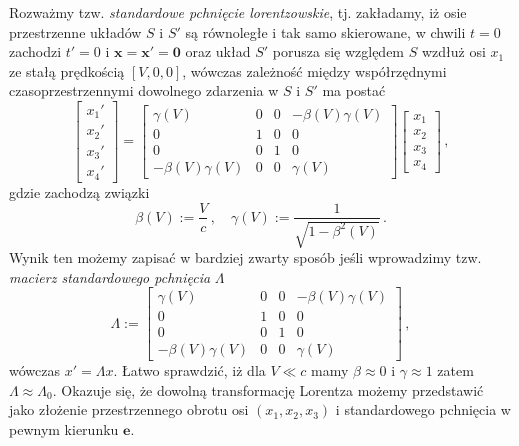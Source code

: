 \documentclass[../main.tex]{subfiles}
\begin{document}
Rozważmy tzw. \textit{standardowe pchnięcie lorentzowskie}, tj. zakładamy, iż osie przestrzenne układów \(S\) i \(S'\) są równoległe i tak samo skierowane, w chwili \(t=0\) zachodzi \(t'=0\) i \(\mathbf{x}=\mathbf{x}'=\mathbf{0}\) oraz układ \(S'\) porusza się względem \(S\) wzdłuż osi \(x_1\) ze stałą prędkością \([V,0,0]\), wówczas zależność między współrzędnymi czasoprzestrzennymi dowolnego zdarzenia w \(S\) i \(S'\) ma postać
\begin{equation*}
    \left[\begin{array}{c}
         x_1'  \\
         x_2'\\
         x_3'\\
         x_4'
    \end{array}\right]=
    \left[\begin{array}{cccc}
         \gamma(V)&0&0&-\beta(V)\gamma(V)  \\
         0&1&0&0  \\
         0&0&1&0  \\
         -\beta(V)\gamma(V)&0&0&\gamma(V)
    \end{array}\right]\left[\begin{array}{cc}
         x_1  \\
         x_2\\
         x_3\\
         x_4
    \end{array}\right]\,,
\end{equation*}
gdzie zachodzą związki
\begin{equation*}
    \beta(V):=\frac{V}{c}\,,\quad \gamma(V):=\frac{1}{\sqrt{1-\beta^2(V)}}\,.
\end{equation*}
Wynik ten możemy zapisać w bardziej zwarty sposób jeśli wprowadzimy tzw. \textit{macierz standardowego pchnięcia} \(\Lambda\)
\begin{equation*}
    \Lambda:=\left[\begin{array}{cccc}
         \gamma(V)&0&0&-\beta(V)\gamma(V)  \\
         0&1&0&0  \\
         0&0&1&0  \\
         -\beta(V)\gamma(V)&0&0&\gamma(V)
    \end{array}\right]\,,
\end{equation*}
wówczas \(x'=\Lambda x\). Łatwo sprawdzić, iż dla \(V\ll c\) mamy \(\beta\approx0\) i \(\gamma\approx 1\) zatem \(\Lambda\approx\Lambda_0\). Okazuje się, że dowolną transformację Lorentza możemy przedstawić jako złożenie przestrzennego obrotu osi \((x_1,x_2,x_3)\) i standardowego pchnięcia w pewnym kierunku \(\mathbf{e}\).
\end{document}
